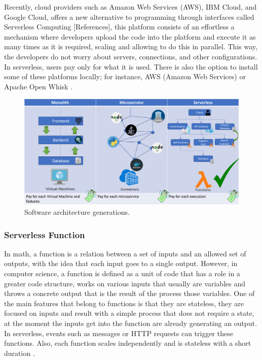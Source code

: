 \documentclass[runningheads]{llncs}
\begin{document}

Recently, cloud providers such as Amazon Web Services (AWS), IBM Cloud, and
Google Cloud, offers a new alternative to programming through interfaces called
Serverless Computing [References], this platform consists of an effortless a
mechanism where developers upload the code into the platform and execute it as
many times as it is required, scaling and allowing to do this in parallel. This
way, the developers do not worry about servers, connections, and other
configurations. In serverless, users pay only for what it is used. There is also
the option to install some of these platforms locally; for instance, AWS (Amazon
Web Services) \cite{Baird2016} or Apache Open Whisk \cite{Guerv2018}. 


\begin{figure}[htp]
  \includegraphics[width=\textwidth]{img/architectures.png}
  \caption{Software architecture generations.} \label{fig1}
  \end{figure}

\subsubsection{Serverless Function} 
In math, a function is a relation between a set of inputs and an allowed set of
outputs, with the idea that each input goes to a single output. However, in
computer science, a function is defined as a unit of code that has a role in a
greater code structure, works on various inputs that usually are variables and
throws a concrete output that is the result of the process those variables. One
of the main features that belong to functions is that they are stateless, they
are focused on inputs and result with a simple process that does not require a
state, at the moment the inputs get into the function are already generating an
output. In serverless, events such as messages or HTTP requests can trigger
these functions. Also, each function scales independently and is stateless with
a short duration \cite{Baird2016,Cook2017}.
\end{document}
